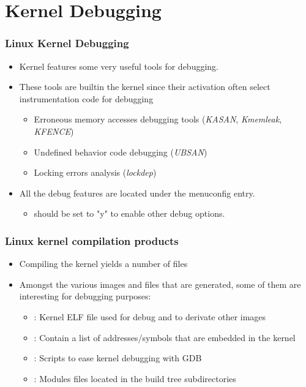 \section{Kernel Debugging}

\begin{frame}
  \frametitle{Linux Kernel Debugging}
  \begin{itemize}
    \item Kernel features some very useful tools for debugging.
    \item These tools are builtin the kernel since their activation often select instrumentation code for debugging
    \begin{itemize}
      \item Erroneous memory accesses debugging tools ({\em KASAN}, {\em Kmemleak}, {\em KFENCE})
      \item Undefined behavior code debugging ({\em UBSAN})
      \item Locking errors analysis ({\em lockdep})
    \end{itemize}
    \item All the debug features are located under the  menuconfig entry.
    \begin{itemize}
    \item {} should be set to "y" to enable other
          debug options.
    \end{itemize}
  \end{itemize}
\end{frame}



\begin{frame}
  \frametitle{Linux kernel compilation products}
  \begin{itemize}
    \item Compiling the kernel yields a number of files
    \item Amongst the various images and files that are generated, some of them
          are interesting for debugging purposes:
    \begin{itemize}
      \item {}: Kernel ELF file used for debug and to derivate other
            images
      \item {}: Contain a list of addresses/symbols that are
            embedded in the kernel
      \item {}: Scripts to ease kernel debugging with GDB
      \item {}: Modules files located in the build tree subdirectories
    \end{itemize}
  \end{itemize}
\end{frame}

